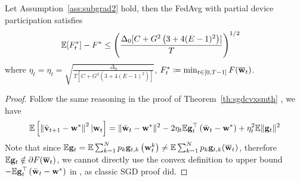 \begin{theorem}
	Let Assumption~\ref{ass:subgrad2} hold, 
	then the FedAvg with partial device participation satisfies
	\begin{align}
		 \mathbb{E}[F^*_t] - F^* &\leq  \left(\frac{\Delta_0[C+ G^2 \left(3 + 4(E-1)^2\right)]}{T}\right)^{1/2}
	\end{align}
	where $\eta_t = \eta_t  = \sqrt{ \frac{\Delta_0}{T[C+ G^2 \left(3 + 4(E-1)^2\right)]}}$,
	$F^*_t \coloneqq \min_{t \in [0, T-1]} F(\overline{{\mathbf{w}}}_t)$.
\end{theorem}
\begin{proof}
Follow the same reasoning in the proof of Theorem~\ref{th:sgdcvxsmth} \eq{\ref{eq:expandsgd}}, we have
\begin{align}
\mathbb{E}\left[\left\|\bar{{\mathbf{v}}}_{t+1}-{\mathbf{w}}^{*}\right\|^2| {\mathbf{w}}_{t}\right]=\|\bar{{\mathbf{w}}}_{t}-{\mathbf{w}}^{*}\|^{2}-2 \eta_{t} \mathbb{E} {\mathbf{g}}_{t}^{\top}\left(\bar{{\mathbf{w}}}_{t}-{\mathbf{w}}^{*}\right)+\eta_{t}^{2} \mathbb{E}\| {\mathbf{g}}_{t} \|^{2}	
\label{eq:expand}
\end{align}
Note that since $\mathbb{E} {\mathbf{g}}_t = \mathbb{E} \sum_{k=1}^{N} p_{k} {\mathbf{g}}_{t, k}\left({\mathbf{w}}_{t}^{k}\right) \neq \mathbb{E} \sum_{k=1}^Np_k {\mathbf{g}}_{t,k}(\overline{{\mathbf{w}}}_t)$, therefore $\mathbb{E} {\mathbf{g}}_t \notin \partial F(\overline{{\mathbf{w}}}_t)$, we cannot directly use the convex definition to
upper bound $- \mathbb{E} {\mathbf{g}}_{t}^{\top}\left(\bar{{\mathbf{w}}}_{t}-{\mathbf{w}}^{*}\right)$ in \eq{\ref{eq:expand}}, as classic SGD proof did. 


\end{proof}
